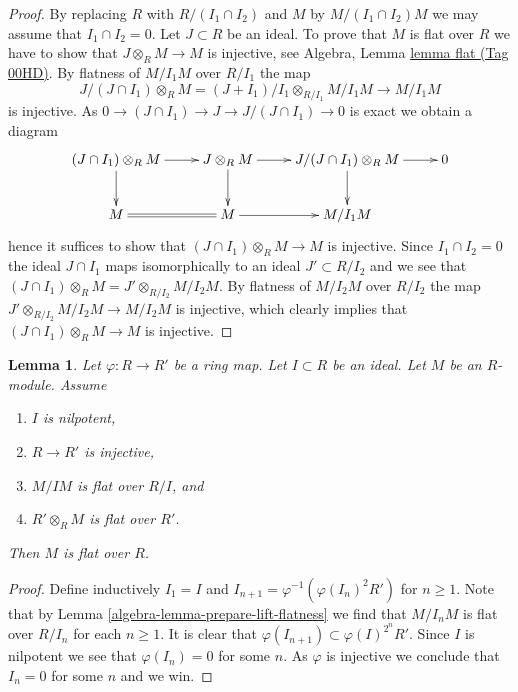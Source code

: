 \documentclass{amsart}
\theoremstyle{plain}
\newtheorem{lemma}[subsection]{Lemma}
\theoremstyle{definition}
\theoremstyle{remark}
\numberwithin{equation}{subsection}
\begin{document}
\begin{proof}
By replacing $R$ with $R/(I_1 \cap I_2)$ and $M$ by $M/(I_1 \cap I_2)M$
we may assume that $I_1 \cap I_2 = 0$. Let $J \subset R$ be an ideal.
To prove that $M$ is flat over $R$ we have to show that
$J \otimes_R M \to M$ is injective, see
Algebra, Lemma \href{https://stacks.math.columbia.edu/tag/00HD}{lemma flat (Tag 00HD)}.
By flatness of $M/I_1M$ over $R/I_1$ the map
$$
J/(J \cap I_1) \otimes_R M =
(J + I_1)/I_1 \otimes_{R/I_1} M/I_1M
\longrightarrow M/I_1M
$$
is injective. As $0 \to (J \cap I_1) \to J \to J/(J \cap I_1) \to 0$
is exact we obtain a diagram
$$
\xymatrix{
(J \cap I_1) \otimes_R M \ar[r] \ar[d] &
J \otimes_R M \ar[r] \ar[d] &
J/(J \cap I_1) \otimes_R M \ar[r] \ar[d] & 0 \\
M \ar@{=}[r] &
M \ar[r] &
M/I_1M
}
$$
hence it suffices to show that $(J \cap I_1) \otimes_R M \to M$ is
injective. Since $I_1 \cap I_2 = 0$ the ideal $J \cap I_1$
maps isomorphically to an ideal $J' \subset R/I_2$ and we see that
$(J \cap I_1) \otimes_R M = J' \otimes_{R/I_2} M/I_2M$. By flatness
of $M/I_2M$ over $R/I_2$ the map $J' \otimes_{R/I_2} M/I_2M \to M/I_2M$
is injective, which clearly implies that $(J \cap I_1) \otimes_R M \to M$ is
injective.
\end{proof}


\begin{lemma}
\label{algebra-lemma-lift-flatness}
Let $\varphi : R \to R'$ be a ring map.
Let $I \subset R$ be an ideal.
Let $M$ be an $R$-module.
Assume
\begin{enumerate}
\item $I$ is nilpotent,
\item $R \to R'$ is injective,
\item $M/IM$ is flat over $R/I$, and
\item $R' \otimes_R M$ is flat over $R'$.
\end{enumerate}
Then $M$ is flat over $R$.
\end{lemma}

\begin{proof}
Define inductively $I_1 = I$ and $I_{n + 1} = \varphi^{-1}(\varphi(I_n)^2R')$
for $n \geq 1$. Note that by
Lemma \ref{algebra-lemma-prepare-lift-flatness}
we find that $M/I_nM$ is flat over $R/I_n$ for each $n \geq 1$.
It is clear that $\varphi(I_{n + 1}) \subset \varphi(I)^{2^n}R'$. Since
$I$ is nilpotent we see that $\varphi(I_n) = 0$ for some $n$. As
$\varphi$ is injective we conclude that $I_n = 0$ for some $n$ and
we win.
\end{proof}
\end{document}
